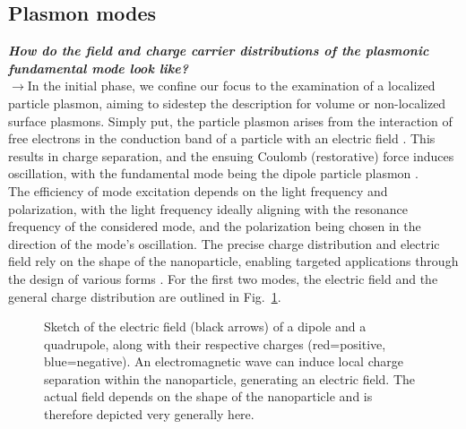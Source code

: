 \subsection{\label{subsec:FZV2}Plasmon modes}
\textbf{\textit{How do the field and charge carrier distributions of the plasmonic fundamental mode look like?}}\\
$\rightarrow$In the initial phase, we confine our focus to the examination of a localized particle plasmon, aiming 
to sidestep the description for volume or non-localized surface plasmons. Simply put, the particle plasmon arises from 
the interaction of free electrons in the conduction band of a particle with an electric field \cite{Anleitung}. 
This results in charge separation, and the ensuing Coulomb (restorative) force induces oscillation, with the fundamental 
mode being the dipole particle plasmon \cite{FZV2p3}. \\
The efficiency of mode excitation depends on the light frequency and polarization, with the light frequency 
ideally aligning with the resonance frequency of the considered mode, and the polarization being chosen in 
the direction of the mode's oscillation. The precise charge distribution and electric field rely on the shape 
of the nanoparticle, enabling targeted applications through the design of various forms \cite{FZV2p1}. 
For the first two modes, the electric field and the general charge distribution are outlined in Fig.~\ref{fig:moden}.
\begin{figure}[h!]
    \centering
    \qquad
    \caption{\label{fig:moden}Sketch of the electric field (black arrows) of a dipole and a quadrupole, 
    along with their respective charges (red=positive, blue=negative). 
    An electromagnetic wave can induce local charge separation within the nanoparticle, 
    generating an electric field. 
    The actual field depends on the shape of the nanoparticle and is therefore depicted very generally here.}
\end{figure}\FloatBarrier \,\\

